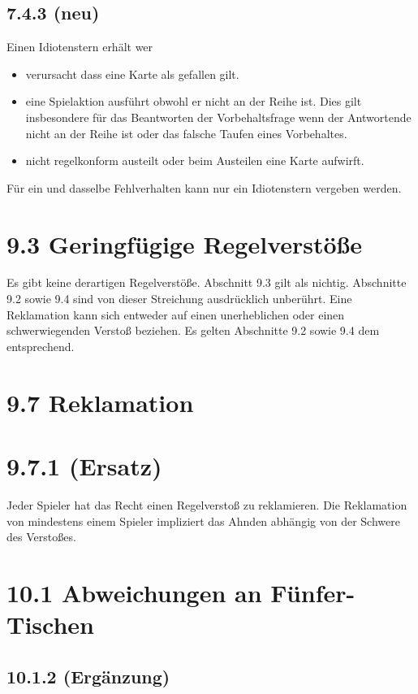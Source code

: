 \subsection*{7.4.3 (neu)}

Einen Idiotenstern erhält wer
\begin{itemize}
    \item{verursacht dass eine Karte als gefallen gilt.}
    \item{eine Spielaktion ausführt obwohl er nicht an der Reihe ist. Dies gilt
        insbesondere für das Beantworten der Vorbehaltsfrage wenn der
        Antwortende nicht an der Reihe ist oder das falsche Taufen eines
        Vorbehaltes.}
    \item{nicht regelkonform austeilt oder beim Austeilen eine Karte aufwirft.}
\end{itemize}

Für ein und dasselbe Fehlverhalten kann nur ein Idiotenstern vergeben werden.

\section*{9.3 Geringfügige Regelverstöße}

Es gibt keine derartigen Regelverstöße. Abschnitt 9.3 gilt als nichtig.
Abschnitte 9.2 sowie 9.4 sind von dieser Streichung ausdrücklich unberührt.
Eine Reklamation kann sich entweder auf einen unerheblichen oder einen
schwerwiegenden Verstoß beziehen. Es gelten Abschnitte 9.2 sowie 9.4 dem
entsprechend.

\section*{9.7 Reklamation}

\section*{9.7.1 (Ersatz)}

Jeder Spieler hat das Recht einen Regelverstoß zu reklamieren. Die Reklamation
von mindestens einem Spieler impliziert das Ahnden abhängig von der Schwere des
Verstoßes.

\section*{10.1 Abweichungen an Fünfer-Tischen}

\subsection*{10.1.2 (Ergänzung)}

